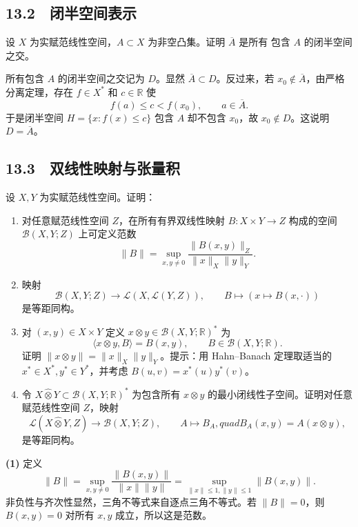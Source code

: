 \subsection*{13.2　闭半空间表示}

\begin{problem}
设 $X$ 为实赋范线性空间，$A\subset X$ 为非空凸集。证明 $\overline A$ 是所有
包含 $A$ 的闭半空间之交。
\end{problem}

所有包含 $A$ 的闭半空间之交记为 $D$。显然 $\overline A\subset D$。反过来，若
$x_0\notin\overline A$，由严格分离定理，存在 $f\in X^*$ 和 $c\in\mathbb R$ 使
\[
 f(a)\le c<f(x_0),\qquad a\in\overline A.
\]
于是闭半空间 $H=\{x:f(x)\le c\}$ 包含 $A$ 却不包含 $x_0$，故
$x_0\notin D$。这说明 $D=\overline A$。

\subsection*{13.3　双线性映射与张量积}

\begin{problem}
设 $X,Y$ 为实赋范线性空间。证明：
\begin{enumerate}
 \item 对任意赋范线性空间 $Z$，在所有有界双线性映射
 $B:X\times Y\to Z$ 构成的空间 $\mathcal B(X,Y;Z)$ 上可定义范数
 \[
  \|B\|=\sup_{x,y\ne0}\frac{\|B(x,y)\|_Z}{\|x\|_X\|y\|_Y}.
 \]
 \item 映射
 \[
  \mathcal B(X,Y;Z)\longrightarrow\mathcal L(X,\mathcal L(Y,Z)),\qquad
  B\longmapsto(x\mapsto B(x,\cdot))
 \]
 是等距同构。
 \item 对 $(x,y)\in X\times Y$ 定义
 $x\otimes y\in\mathcal B(X,Y;\mathbb R)^*$ 为
 \[
  \langle x\otimes y,B\rangle=B(x,y),\qquad
  B\in\mathcal B(X,Y;\mathbb R).
 \]
 证明 $\|x\otimes y\|=\|x\|_X\|y\|_Y$。提示：用 Hahn--Banach 定理取适当的
 $x^*\in X^*,y^*\in Y^*$，并考虑 $B(u,v)=x^*(u)y^*(v)$。
 \item 令 $X\widehat\otimes Y\subset\mathcal B(X,Y;\mathbb R)^*$ 为包含所有
 $x\otimes y$ 的最小闭线性子空间。证明对任意赋范线性空间 $Z$，映射
 \[
  \mathcal L(X\widehat\otimes Y,Z)\longrightarrow\mathcal B(X,Y;Z),
  \qquad A\longmapsto B_A,quad B_A(x,y)=A(x\otimes y),
 \]
 是等距同构。
\end{enumerate}
\end{problem}

\textbf{(1)} 定义
\[
 \|B\|=\sup_{x,y\ne0}\frac{\|B(x,y)\|}{\|x\|\|y\|}
 =\sup_{\|x\|\le1,\|y\|\le1}\|B(x,y)\|.
\]
非负性与齐次性显然，三角不等式来自逐点三角不等式。若 $\|B\|=0$，则
$B(x,y)=0$ 对所有 $x,y$ 成立，所以这是范数。

